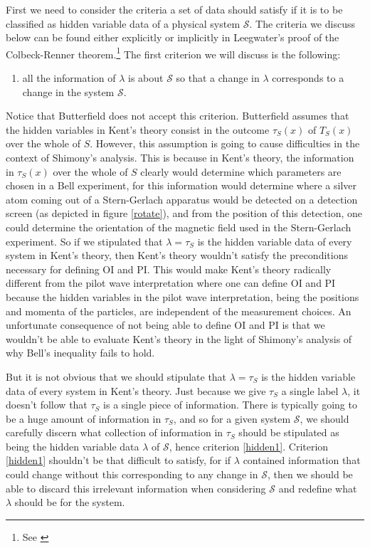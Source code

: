 First we need to consider the criteria a set of data should satisfy if it is to be classified as hidden variable data of a physical system $\mathcal{S}$. The criteria we discuss below can be found either explicitly or implicitly in Leegwater's proof of the Colbeck-Renner theorem.\footnote{See \cite{LeegwaterGijs2016Aitf}} The first criterion we will discuss is the following:
\begin{enumerate}
	\item all the information of $\lambda$ is about $\mathcal{S}$ so that a change in $\lambda$ corresponds to a change in the system $\mathcal{S}$.\label{hidden1}
\end{enumerate} 
Notice that Butterfield does not accept this criterion. Butterfield assumes that the hidden variables in Kent's theory consist in the outcome $\tau_S(x)$ of $T_S(x)$ over the whole of $S$. However, this assumption is going to cause difficulties in the context of Shimony's analysis. This is because in Kent's theory, the information in $\tau_S(x)$ over the whole of $S$ clearly would determine which parameters are chosen in a Bell experiment, for this information would determine where a silver atom coming out of a Stern-Gerlach apparatus would be detected on a detection screen (as depicted in figure \ref{rotate}), and from the position of this detection, one could determine the orientation of the magnetic field used in the Stern-Gerlach experiment. So if we stipulated that $\lambda=\tau_S$ is the hidden variable data of every system in Kent's theory, then Kent's theory wouldn't satisfy the preconditions necessary for defining OI and PI. This would make Kent's theory radically different from the pilot wave interpretation where one can define OI and PI because the hidden variables in the pilot wave interpretation, being the positions and momenta of the particles, are independent of the measurement choices. An unfortunate consequence of not being able to define OI and PI is that we wouldn't be able to evaluate Kent's theory in the light of Shimony's analysis of why Bell's inequality fails to hold. 

But it is not obvious that we should stipulate that $\lambda=\tau_S$ is the hidden variable data of every system in Kent's theory. Just because we give $\tau_S$ a single label $\lambda$, it doesn't follow that $\tau_S$ is a single piece of information. There is typically going to be a huge amount of information in $\tau_S$, and so for a given system $\mathcal{S}$, we should carefully discern  what collection of information in $\tau_S$ should be stipulated as being the hidden variable data $\lambda$ of $\mathcal{S}$, hence criterion \ref{hidden1}. Criterion \ref{hidden1} shouldn't be that difficult to satisfy, for if $\lambda$ contained information that could change without this corresponding to any change in $\mathcal{S}$, then we should be able to discard this irrelevant information when considering $\mathcal{S}$ and redefine what $\lambda$ should be for the system. 


